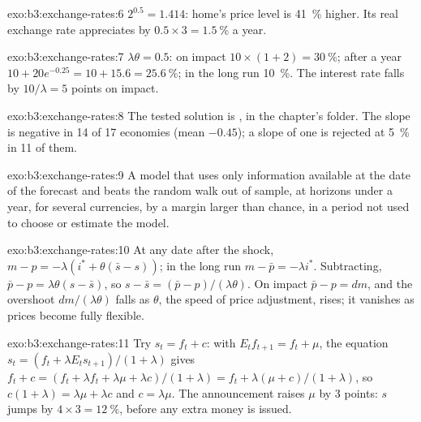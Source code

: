 \begin{solution}{exo:b3:exchange-rates:6}
$2^{0.5} = 1.414$: home's price level is 41~\% higher. Its real exchange rate
appreciates by $0.5 \times 3 = 1.5~\%$ a year.
\end{solution}

\begin{solution}{exo:b3:exchange-rates:7}
$\lambda\theta = 0.5$: on impact $10 \times (1 + 2) = 30~\%$; after a year $10 + 20e^{-0.25} = 10 + 15.6 = 25.6~\%$;
in the long run 10~\%. The interest rate falls by $10/\lambda = 5$ points on impact.
\end{solution}

\begin{solution}{exo:b3:exchange-rates:8}
The tested solution is , in the chapter's
 folder. The slope is negative in 14 of 17 economies (mean $-0.45$);
a slope of one is rejected at 5~\% in 11 of them. %
\end{solution}

\begin{solution}{exo:b3:exchange-rates:9}
A model that uses only information available at the date of the forecast and
beats the random walk out of sample, at horizons under a year, for several
currencies, by a margin larger than chance, in a period not used to choose or
estimate the model.
\end{solution}

\begin{solution}{exo:b3:exchange-rates:10}
At any date after the shock, $m - p = -\lambda(i^* + \theta(\bar s - s))$; in the long run
$m - \bar p = -\lambda i^*$. Subtracting, $\bar p - p = \lambda\theta(s - \bar s)$, so $s - \bar s = (\bar p - p)/(\lambda\theta)$. On
impact $\bar p - p = dm$, and the overshoot $dm/(\lambda\theta)$ falls as $\theta$, the speed of price
adjustment, rises; it vanishes as prices become fully flexible.
\end{solution}

\begin{solution}{exo:b3:exchange-rates:11}
Try $s_t = f_t + c$: with $E_tf_{t+1} = f_t + \mu$, the equation $s_t = (f_t + \lambda E_ts_{t+1})/(1 + \lambda)$
gives $f_t + c = (f_t + \lambda f_t + \lambda\mu + \lambda c)/(1 + \lambda) = f_t + \lambda(\mu + c)/(1 + \lambda)$, so $c(1 + \lambda) = \lambda\mu + \lambda c$
and $c = \lambda\mu$. The announcement raises $\mu$ by 3 points: $s$ jumps by $4 \times 3 = 12~\%$, before
any extra money is issued.
\end{solution}

